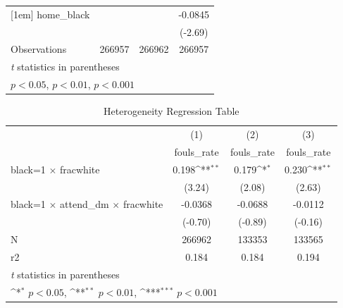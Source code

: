 \begin{table}[htbp]
\begin{tabular}{l*{3}{c}}
[1em]
home\_black          &                     &                     &     -0.0845\sym{**} \\
                    &                     &                     &     (-2.69)         \\
\hline
Observations        &      266957         &      266962         &      266957         \\
\hline\hline
\multicolumn{4}{l}{\footnotesize \textit{t} statistics in parentheses}\\
\multicolumn{4}{l}{\footnotesize \sym{*} \(p<0.05\), \sym{**} \(p<0.01\), \sym{***} \(p<0.001\)}\\
\end{tabular}
\end{table}
\begin{table}[htbp]\centering
\def\sym#1{\ifmmode^{#1}\else\(^{#1}\)\fi}
\caption{Heterogeneity Regression Table \label{tab3}}
\begin{tabular}{l*{3}{c}}
\hline\hline
                    &\multicolumn{1}{c}{(1)}&\multicolumn{1}{c}{(2)}&\multicolumn{1}{c}{(3)}\\
                    &\multicolumn{1}{c}{fouls\_rate}&\multicolumn{1}{c}{fouls\_rate}&\multicolumn{1}{c}{fouls\_rate}\\
\hline
black=1 $\times$ fracwhite&       0.198\sym{**} &       0.179\sym{*}  &       0.230\sym{**} \\
                    &      (3.24)         &      (2.08)         &      (2.63)         \\
[1em]
black=1 $\times$ attend\_dm $\times$ fracwhite&     -0.0368         &     -0.0688         &     -0.0112         \\
                    &     (-0.70)         &     (-0.89)         &     (-0.16)         \\
\hline
N                   &      266962         &      133353         &      133565         \\
r2                  &       0.184         &       0.184         &       0.194         \\
\hline\hline
\multicolumn{4}{l}{\footnotesize \textit{t} statistics in parentheses}\\
\multicolumn{4}{l}{\footnotesize \sym{*} \(p<0.05\), \sym{**} \(p<0.01\), \sym{***} \(p<0.001\)}\\
\end{tabular}
\end{table}
